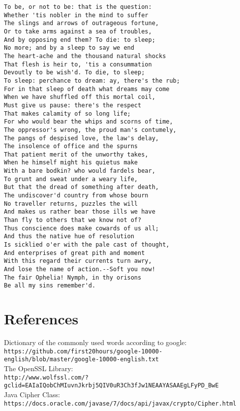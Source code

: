 \documentclass{article}
\begin{document}
\begin{verbatim}
To be, or not to be: that is the question:
Whether 'tis nobler in the mind to suffer
The slings and arrows of outrageous fortune,
Or to take arms against a sea of troubles,
And by opposing end them? To die: to sleep;
No more; and by a sleep to say we end
The heart-ache and the thousand natural shocks
That flesh is heir to, 'tis a consummation
Devoutly to be wish'd. To die, to sleep;
To sleep: perchance to dream: ay, there's the rub;
For in that sleep of death what dreams may come
When we have shuffled off this mortal coil,
Must give us pause: there's the respect
That makes calamity of so long life;
For who would bear the whips and scorns of time,
The oppressor's wrong, the proud man's contumely,
The pangs of despised love, the law's delay,
The insolence of office and the spurns
That patient merit of the unworthy takes,
When he himself might his quietus make
With a bare bodkin? who would fardels bear,
To grunt and sweat under a weary life,
But that the dread of something after death,
The undiscover'd country from whose bourn
No traveller returns, puzzles the will
And makes us rather bear those ills we have
Than fly to others that we know not of?
Thus conscience does make cowards of us all;
And thus the native hue of resolution
Is sicklied o'er with the pale cast of thought,
And enterprises of great pith and moment
With this regard their currents turn awry,
And lose the name of action.--Soft you now!
The fair Ophelia! Nymph, in thy orisons
Be all my sins remember'd.
\end{verbatim}

\section{References}

	Dictionary of the commonly used words according to google:\\
	 \verb|https://github.com/first20hours/google-10000-english/blob/master/google-10000-english.txt|
	\\The OpenSSL Library:\\
	 \verb|http://www.wolfssl.com/?gclid=EAIaIQobChMIuvnJkrbj5QIV0uR3Ch3fJw1NEAAYASAAEgLFyPD_BwE|
	\\Java Cipher Class:\\
	 \verb|https://docs.oracle.com/javase/7/docs/api/javax/crypto/Cipher.html|
		
\end{document}

